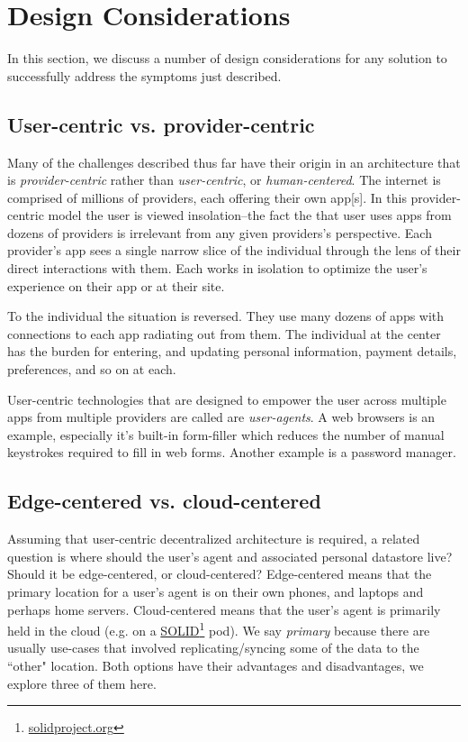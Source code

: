 \documentclass[11pt, oneside]{article}   	%
\newcommand{\hyperfootnote}[1][]{\def\ArgI{{#1}}\hyperfootnoteRelay}
\newcommand\hyperfootnoteRelay[2][]{\href{#1#2}{\ArgI}\footnote{\href{#1#2}{#2}}}
\begin{document}
\section{Design Considerations}%

In this section, we discuss a number of design considerations for any solution to successfully address the symptoms just described.

\subsection{User-centric vs. provider-centric}

Many of the challenges described thus far have their origin in an architecture that is \emph{provider-centric} rather than \emph{user-centric}, or \emph{human-centered}. The internet is comprised of millions of providers, each offering their own app[s]. In this provider-centric model the user is viewed insolation--the fact the that user uses apps from dozens of providers is irrelevant from any given providers's perspective. Each provider's app sees a single narrow slice of the individual through the lens of their direct interactions with them. Each works in isolation to optimize the user's experience on their app or at their site. 

To the individual the situation is reversed. They use many dozens of apps with connections to each app radiating out from them. The individual at the center has the burden for entering, and updating personal information, payment details, preferences, and so on at each.

User-centric technologies that are designed to empower the user across multiple apps from multiple providers are called are \emph{user-agents}. A web browsers is an example, especially it's built-in form-filler which reduces the number of manual keystrokes required to fill in web forms. Another example is a password manager. 

\subsection{Edge-centered vs. cloud-centered}
Assuming that user-centric decentralized architecture is required, a related question is where should the user's agent and associated personal datastore live? Should it be edge-centered, or cloud-centered? Edge-centered means that the primary location for a user's agent is on their own phones, and laptops and perhaps home servers. Cloud-centered means that the user's agent is primarily held in the cloud (e.g. on a \hyperfootnote[SOLID][https://]{solidproject.org} pod). We say \emph{primary} because there are usually use-cases that involved replicating/syncing some of the data to the ``other" location. Both options have their advantages and disadvantages, we explore three of them here.
\end{document}

